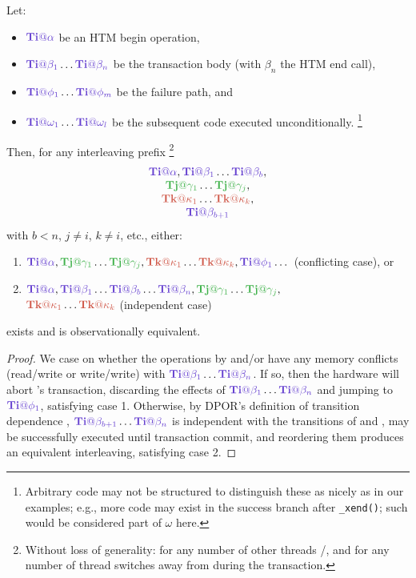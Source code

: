 \documentclass[10pt]{sigplanconf}
\begin{document}
\begin{lemma}
	\label{lem:equiv}
	Let:
	\begin{itemize}
		\item $\tiiat{\alpha}$ be an HTM begin operation,
		\item $\tiiat{\beta_1}\dots\tiiat{\beta_n}$ be the transaction body (with $\beta_n$ the HTM end call),
		\item $\tiiat{\phi_1}\dots\tiiat{\phi_m}$ be the failure path, and
		\item $\tiiat{\omega_1}\dots\tiiat{\omega_l}$ be the subsequent code executed unconditionally.%
			\footnote{Arbitrary code may not be structured to distinguish these as nicely as in our examples;
			e.g., more code may exist in the success branch after {\tt \_xend()};
			such would be considered part of $\omega$ here.}
	\end{itemize}
	Then, for any interleaving prefix%
	\footnote{Without loss of generality: for any number of other threads \tjj/\tkk,
	and for any number of thread switches away from \tii during the transaction.}
	\[
	\begin{tabular}{c}
		$\tiiat{\alpha},\tiiat{\beta_1}\dots\tiiat{\beta_b},$\\
		$\tjjat{\gamma_1}\dots\tjjat{\gamma_j},$ \\
		$\tkkat{\kappa_1}\dots\tkkat{\kappa_k},$ \\
		$\tiiat{\beta_{b+1}}$ %
	\end{tabular}
	\]
	with $b<n$, $j \ne i$, $k \ne i$, etc., either:
	\begin{enumerate}
		\item $\tiiat{\alpha},\tjjat{\gamma_1}\dots\tjjat{\gamma_j},\tkkat{\kappa_1}\dots\tkkat{\kappa_k},\tiiat{\phi_1}\dots$
			(conflicting case), or
		\item $\tiiat{\alpha},\tiiat{\beta_1}\dots\tiiat{\beta_b}\dots\tiiat{\beta_n},\tjjat{\gamma_1}\dots\tjjat{\gamma_j},$ \\
			$\tkkat{\kappa_1}\dots\tkkat{\kappa_k}$
			(independent case)
	\end{enumerate}
	exists and is observationally equivalent.
\end{lemma}

\begin{proof}
	We case on whether the operations by \tjj and/or \tkk have any memory conflicts (read/write or write/write)
	with $\tiiat{\beta_1}\dots\tiiat{\beta_n}$.
	If so, then the hardware will abort \tii's transaction, discarding the effects of $\tiiat{\beta_1}\dots\tiiat{\beta_n}$
	and jumping to $\tiiat{\phi_1}$,
	satisfying case 1.
	Otherwise, by DPOR's definition of transition dependence \cite{dpor,landslide-phdthesis},
	$\tiiat{\beta_{b+1}}\dots\tiiat{\beta_n}$ is independent with the transitions of \tjj and \tkk,
	may be successfully executed until transaction commit,
	and reordering them produces an equivalent interleaving,
	satisfying case 2.
\end{proof}
\end{document}

